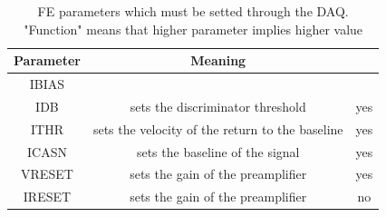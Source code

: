         \begin{table}
            \begin{center}
            \begin{tabular}{|c | c | c |}
            \hline
            Parameter & Meaning & \\
            \hline
            \hline
            IBIAS & \\
            IDB & sets the discriminator threshold & yes\\
            ITHR & sets the velocity of the return to the baseline & yes \\
            ICASN & sets the baseline of the signal & yes\\
            VRESET & sets the gain of the preamplifier & yes\\
            IRESET & sets the gain of the preamplifier & no\\
            \hline
            \end{tabular}
            \caption{FE parameters which must be setted through the DAQ. "Function" means that higher parameter implies higher value}
            \label{tab:FE-parameters}
            \end{center}
        \end{table}
    


